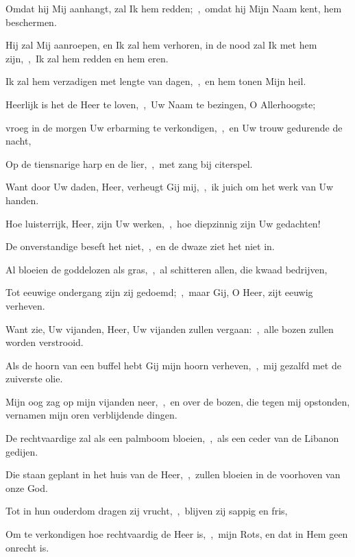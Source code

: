 \documentclass[12pt,twoside,a5paper]{article}
\begin{document}
\begin{halfparskip}

  Omdat hij Mij aanhangt, zal Ik hem redden;~\sep\ omdat hij Mijn Naam kent, hem beschermen.

  Hij zal Mij aanroepen, en Ik zal hem verhoren, in de nood zal Ik met hem zijn,~\sep\ Ik zal hem redden en hem eren.

  Ik zal hem verzadigen met lengte van dagen,~\sep\ en hem tonen Mijn heil.
\end{halfparskip}


\begin{halfparskip}

  Heerlijk is het de Heer te loven,~\sep\ Uw Naam te bezingen, O Allerhoogste;

  vroeg in de morgen Uw erbarming te verkondigen,~\sep\ en Uw trouw gedurende de nacht,

  Op de tiensnarige harp en de lier,~\sep\ met zang bij citerspel.

  Want door Uw daden, Heer, verheugt Gij mij,~\sep\ ik juich om het werk van Uw handen.
\end{halfparskip}

\begin{halfparskip}

  Hoe luisterrijk, Heer, zijn Uw werken,~\sep\ hoe diepzinnig zijn Uw gedachten!

  De onverstandige beseft het niet,~\sep\ en de dwaze ziet het niet in.

  Al bloeien de goddelozen als gras,~\sep\ al schitteren allen, die kwaad bedrijven,

  Tot eeuwige ondergang zijn zij gedoemd;~\sep\ maar Gij, O Heer, zijt eeuwig verheven.

  Want zie, Uw vijanden, Heer, Uw vijanden zullen vergaan:~\sep\ alle bozen zullen worden verstrooid.

  Als de hoorn van een buffel hebt Gij mijn hoorn verheven,~\sep\ mij gezalfd met de zuiverste olie.

  Mijn oog zag op mijn vijanden neer,~\sep\ en over de bozen, die tegen mij opstonden, vernamen mijn oren verblijdende dingen.
\end{halfparskip}

\begin{halfparskip}

  De rechtvaardige zal als een palmboom bloeien,~\sep\ als een ceder van de Libanon gedijen.

  Die staan geplant in het huis van de Heer,~\sep\ zullen bloeien in de voorhoven van onze God.

  Tot in hun ouderdom dragen zij vrucht,~\sep\ blijven zij sappig en fris,

  Om te verkondigen hoe rechtvaardig de Heer is,~\sep\ mijn Rots, en dat in Hem geen onrecht is.
\end{halfparskip}
\end{document}
